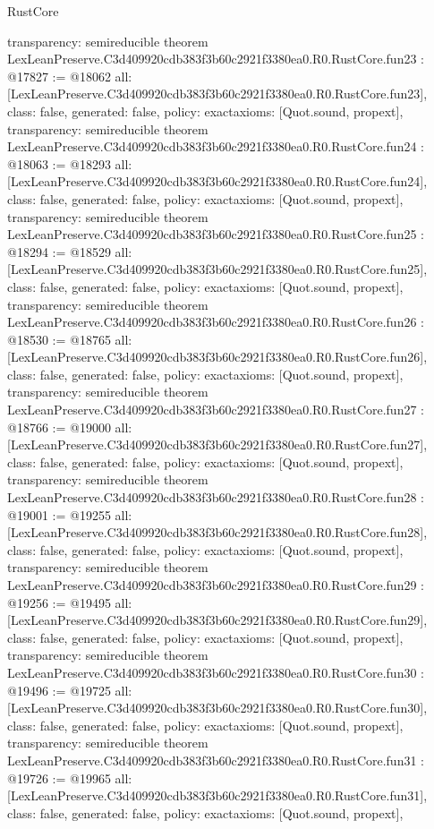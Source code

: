 \begin{lexlean}{RustCore}
\begin{coremodule}
{  transparency: semireducible
}
theorem LexLeanPreserve.C3d409920cdb383f3b60c2921f3380ea0.R0.RustCore.fun23 : @17827 := @18062 {
  all: [LexLeanPreserve.C3d409920cdb383f3b60c2921f3380ea0.R0.RustCore.fun23],
  class: false,
  generated: false,
  policy: exact{axioms: [Quot.sound, propext]},
  transparency: semireducible
}
theorem LexLeanPreserve.C3d409920cdb383f3b60c2921f3380ea0.R0.RustCore.fun24 : @18063 := @18293 {
  all: [LexLeanPreserve.C3d409920cdb383f3b60c2921f3380ea0.R0.RustCore.fun24],
  class: false,
  generated: false,
  policy: exact{axioms: [Quot.sound, propext]},
  transparency: semireducible
}
theorem LexLeanPreserve.C3d409920cdb383f3b60c2921f3380ea0.R0.RustCore.fun25 : @18294 := @18529 {
  all: [LexLeanPreserve.C3d409920cdb383f3b60c2921f3380ea0.R0.RustCore.fun25],
  class: false,
  generated: false,
  policy: exact{axioms: [Quot.sound, propext]},
  transparency: semireducible
}
theorem LexLeanPreserve.C3d409920cdb383f3b60c2921f3380ea0.R0.RustCore.fun26 : @18530 := @18765 {
  all: [LexLeanPreserve.C3d409920cdb383f3b60c2921f3380ea0.R0.RustCore.fun26],
  class: false,
  generated: false,
  policy: exact{axioms: [Quot.sound, propext]},
  transparency: semireducible
}
theorem LexLeanPreserve.C3d409920cdb383f3b60c2921f3380ea0.R0.RustCore.fun27 : @18766 := @19000 {
  all: [LexLeanPreserve.C3d409920cdb383f3b60c2921f3380ea0.R0.RustCore.fun27],
  class: false,
  generated: false,
  policy: exact{axioms: [Quot.sound, propext]},
  transparency: semireducible
}
theorem LexLeanPreserve.C3d409920cdb383f3b60c2921f3380ea0.R0.RustCore.fun28 : @19001 := @19255 {
  all: [LexLeanPreserve.C3d409920cdb383f3b60c2921f3380ea0.R0.RustCore.fun28],
  class: false,
  generated: false,
  policy: exact{axioms: [Quot.sound, propext]},
  transparency: semireducible
}
theorem LexLeanPreserve.C3d409920cdb383f3b60c2921f3380ea0.R0.RustCore.fun29 : @19256 := @19495 {
  all: [LexLeanPreserve.C3d409920cdb383f3b60c2921f3380ea0.R0.RustCore.fun29],
  class: false,
  generated: false,
  policy: exact{axioms: [Quot.sound, propext]},
  transparency: semireducible
}
theorem LexLeanPreserve.C3d409920cdb383f3b60c2921f3380ea0.R0.RustCore.fun30 : @19496 := @19725 {
  all: [LexLeanPreserve.C3d409920cdb383f3b60c2921f3380ea0.R0.RustCore.fun30],
  class: false,
  generated: false,
  policy: exact{axioms: [Quot.sound, propext]},
  transparency: semireducible
}
theorem LexLeanPreserve.C3d409920cdb383f3b60c2921f3380ea0.R0.RustCore.fun31 : @19726 := @19965 {
  all: [LexLeanPreserve.C3d409920cdb383f3b60c2921f3380ea0.R0.RustCore.fun31],
  class: false,
  generated: false,
  policy: exact{axioms: [Quot.sound, propext]},
}
\end{coremodule}
\end{lexlean}
